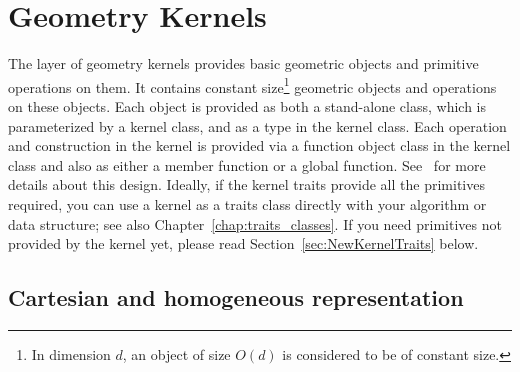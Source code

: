 
\chapter{Geometry Kernels} \label{chap:kernels}


The layer of geometry kernels
provides basic geometric objects
and primitive operations on them. 
It contains constant size\footnote{In dimension $d$, an object of 
size $O(d)$ is considered to be of constant size.} geometric objects
and operations on these objects.
Each object is provided as both a stand-alone class, which is parameterized
by a kernel class, and as a type in the kernel class.  Each operation and 
construction in the kernel is provided via a function object class in the 
kernel class and also as either a member function or a global function. 
See~\cite{hhkps-aegk-01} for more details about this design.
%
%
Ideally, if the kernel traits provide all the primitives required,
you can use a kernel as a traits class directly with your algorithm or 
data structure; see also Chapter~\ref{chap:traits_classes}.
If you need primitives not provided by the kernel yet, please
read Section~\ref{sec:NewKernelTraits} below.

\section{Cartesian and homogeneous representation}
\label{sec:cart_and_hom_representation}

